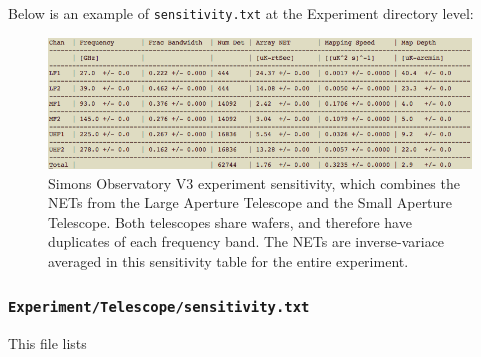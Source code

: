 \documentclass[11pt]{article} %
\begin{document}
Below is an example of \texttt{sensitivity.txt} at the Experiment directory level:

\begin{figure}[h!]
	\centering
	\includegraphics[width=1.0\textwidth]{Experiment_sensEx}
	\caption{Simons Observatory V3 experiment sensitivity, which combines the NETs from the Large Aperture Telescope and the Small Aperture Telescope. Both telescopes share wafers, and therefore have duplicates of each frequency band. The NETs are inverse-variace averaged in this sensitivity table for the entire experiment. \label{expSens}}
\end{figure}


\subsubsection{\texttt{Experiment/Telescope/sensitivity.txt}}

This file lists
\end{document}
